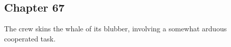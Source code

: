 \subsection{Chapter 67}

The crew skins the whale of its blubber, involving a somewhat arduous
cooperated task.

